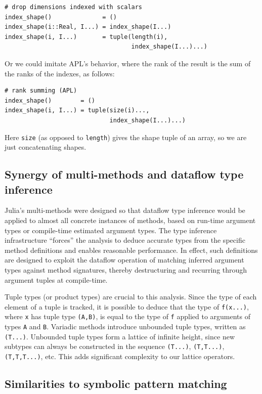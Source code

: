 \documentclass[preprint]{sigplanconf}
\newcommand{\code}[1]{\texttt{#1}}
\begin{document}
{\small
\begin{verbatim}
# drop dimensions indexed with scalars
index_shape()              = ()
index_shape(i::Real, I...) = index_shape(I...)
index_shape(i, I...)       = tuple(length(i),
                                   index_shape(I...)...)
\end{verbatim}
}

Or we could imitate APL's behavior, where the rank of the result is the sum
of the ranks of the indexes, as follows:

{\small
\begin{verbatim}
# rank summing (APL)
index_shape()        = ()
index_shape(i, I...) = tuple(size(i)...,
                             index_shape(I...)...)
\end{verbatim}
}

Here \code{size} (as opposed to \code{length}) gives the shape tuple of an array,
so we are just concatenating shapes.


\subsection{Synergy of multi-methods and dataflow type inference}

Julia's multi-methods were designed so that dataflow type inference
would be applied to almost all concrete instances of methods, based on
run-time argument types or compile-time estimated argument types. The
type inference infrastructure ``forces'' the analysis to deduce accurate
types from the specific method definitions and enables reasonable
performance. In effect, such definitions are designed to exploit the dataflow
operation of matching inferred argument types against method signatures,
thereby destructuring and recurring through argument tuples at compile-time.

Tuple types (or product types) are crucial to this analysis. Since the type
of each element of a tuple is tracked, it is possible to deduce that
the type of \code{f(x...)}, where \code{x} has tuple type \code{(A,B)}, is
equal to the type of \code{f} applied to arguments of types \code{A} and
\code{B}. Variadic methods introduce unbounded tuple types, written as
\code{(T...)}. Unbounded tuple types form a lattice of infinite height,
since new subtypes can always be constructed in the sequence
\code{(T...)}, \code{(T,T...)}, \code{(T,T,T...)}, etc. This adds
significant complexity to our lattice operators.

\subsection{Similarities to symbolic pattern matching}
\end{document}

